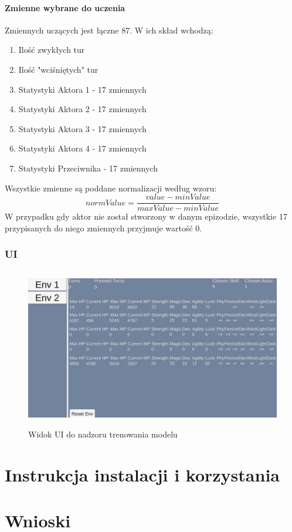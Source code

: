 \documentclass{SGGW-thesis}
\begin{document}
\subsubsection{Zmienne wybrane do uczenia}
Zmiennych uczących jest łączne 87. W ich skład wchodzą:
\begin{enumerate}
  \item{Ilość zwykłych tur}
  \item{Ilość "wciśniętych" tur}
  \item{Statystyki Aktora 1 - 17 zmiennych}
  \item{Statystyki Aktora 2 - 17 zmiennych}
  \item{Statystyki Aktora 3 - 17 zmiennych}
  \item{Statystyki Aktora 4 - 17 zmiennych}
  \item{Statystyki Przeciwnika - 17 zmiennych}
\end{enumerate}
Wszystkie zmienne są poddane normalizacji według wzoru:
\[normValue = \frac{value-minValue}{maxValue-minValue}\]
W przypadku gdy aktor nie został stworzony w danym epizodzie, wszystkie 17 przypisanych do niego zmiennych przyjmuje wartość 0.
\subsection{UI}
\begin{figure}[H]
  \centering
  \includegraphics[height=7cm]{trainingui.JPG}
  \caption{Widok UI do nadzoru trenowania modelu}
\end{figure}

\chapter{Instrukcja instalacji i korzystania}


\chapter{Wnioski}
\end{document}
